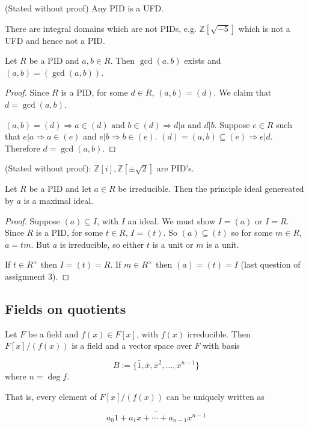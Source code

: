 \begin{theorem}
	(Stated without proof) Any PID is a UFD.
\end{theorem}

\begin{remark}
	There are integral domains which are not PIDs, e.g. $\mathbb{Z}[\sqrt{-5}]$ which is not a UFD and hence not a PID.
\end{remark}

\begin{proposition}
	Let $R$ be a PID and $a, b \in R$. Then $\gcd(a, b)$ exists and $(a, b) = (\gcd(a, b))$.
\end{proposition}

\begin{proof}
	Since $R$ is a PID, for some $d \in R$, $(a, b) = (d)$. We claim that $d = \gcd(a, b)$.

	$(a, b) = (d) \Rightarrow a \in (d) \text{ and } b \in (d) \Rightarrow d | a \text{ and } d | b$. Suppose $e \in R$ such that $e | a \Rightarrow a \in (e)$ and $e | b \Rightarrow b \in (e)$. $(d) = (a, b) \subseteq (e) \Rightarrow e | d$. Therefore $d = \gcd(a, b)$.
\end{proof}

\begin{theorem}
	(Stated without proof): $\mathbb{Z}[i], \mathbb{Z}[\pm \sqrt{2}]$ are PID's.
\end{theorem}

\begin{lemma}
	Let $R$ be a PID and let $a \in R$ be irreducible. Then the principle ideal genereated by $a$ is a maximal ideal.
\end{lemma}

\begin{proof}
	Suppose $(a) \subseteq I$, with $I$ an ideal. We must show $I = (a)$ or $I = R$. Since $R$ is a PID, for some $t \in R$, $I = (t)$. So $(a) \subseteq (t)$ so for some $m \in R$, $a = t m$. But $a$ is irreducible, so either $t$ is a unit or $m$ is a unit.

	If $t \in R^{\times}$ then $I = (t) = R$. If $m \in R^{\times}$ then $(a) = (t) = I$ (last question of assignment 3).
\end{proof}

\subsection{Fields on quotients}

\begin{theorem}
	Let $F$ be a field and $f(x) \in F[x]$, with $f(x)$ irreducible. Then $F[x] / (f(x))$ is a field and a vector space over $F$ with basis

	\[ B := \{\bar{1}, \bar{x}, \bar{x}^2, \ldots, \bar{x}^{n - 1} \} \] where $n = \deg f$.

	That is, every element of $F[x] / (f(x))$ can be uniquely written as

	\[ \overline{a_0 1 + a_1 x + \cdots + a_{n - 1} x^{n - 1}} \]
\end{theorem}

